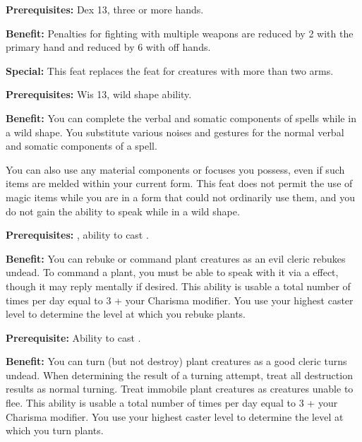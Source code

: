 \textbf{Prerequisites:} Dex 13, three or more hands.

\textbf{Benefit:} Penalties for fighting with multiple weapons are reduced by 2 with the primary hand and reduced by 6 with off hands.

\textbf{Special:} This feat replaces the  feat for creatures with more than two arms.


\textbf{Prerequisites:} Wis 13, wild shape ability.

\textbf{Benefit:} You can complete the verbal and somatic components of spells while in a wild shape. You substitute various noises and gestures for the normal verbal and somatic components of a spell.

You can also use any material components or focuses you possess, even if such items are melded within your current form. This feat does not permit the use of magic items while you are in a form that could not ordinarily use them, and you do not gain the ability to speak while in a wild shape.


\textbf{Prerequisites:} , ability to cast .

\textbf{Benefit:} You can rebuke or command plant creatures as an evil cleric rebukes undead. To command a plant, you must be able to speak with it via a  effect, though it may reply mentally if desired. This ability is usable a total number of times per day equal to 3 + your Charisma modifier. You use your highest caster level to determine the level at which you rebuke plants.


\textbf{Prerequisite:} Ability to cast .

\textbf{Benefit:} You can turn (but not destroy) plant creatures as a good cleric turns undead. When determining the result of a turning attempt, treat all destruction results as normal turning. Treat immobile plant creatures as creatures unable to flee. This ability is usable a total number of times per day equal to 3 + your Charisma modifier. You use your highest caster level to determine the level at which you turn plants.


